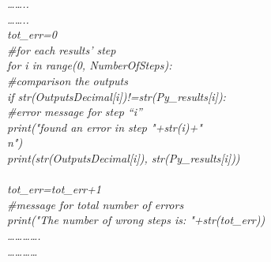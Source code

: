 \textit{……..\\
……..\\
tot\_err=0\\
\#for each results’ step\\
for i in range(0, NumberOfSteps):\\
\hspace*{1cm}\#comparison the outputs\\
\hspace*{1cm}if str(OutputsDecimal[i])!=str(Py\_results[i]):\\
\hspace*{2cm}\#error message for step “i”    \\
\hspace*{2cm}print("found an error in step "+str(i)+"\\n")\\
\hspace*{2cm}print(str(OutputsDecimal[i]), str(Py\_results[i]))\\
\\
\hspace*{2cm}tot\_err=tot\_err+1\\
\#message for total number of errors\\
print("The number of wrong steps is: "+str(tot\_err))\\
………….\\
…………}\\
\\
